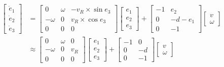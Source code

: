           \begin{align}
               \begin{bmatrix}
               \dot{e}_1 \\
               \dot{e}_2 \\
               \dot{e}_3
               \end{bmatrix} &= \begin{bmatrix}
               0 & \omega & -v_R \times \sin e_3 \\
               -\omega & 0 & v_R \times \cos e_3 \\
               0 & 0 & 0
               \end{bmatrix} \begin{bmatrix}
               e_1 \\
               e_2 \\
               e_3
               \end{bmatrix} + \begin{bmatrix}
               -1 & e_2 \\
               0 & -d - e_1 \\
               0 & -1
               \end{bmatrix} \begin{bmatrix}
               v \\
               \omega
               \end{bmatrix}\\
               &\approx \begin{bmatrix}
               0 & \omega & 0 \\
               -\omega & 0 & v_R \\
               0 & 0 & 0
               \end{bmatrix} \begin{bmatrix}
               e_1 \\
               e_2 \\
               e_3
               \end{bmatrix} + \begin{bmatrix}
               -1 & 0 \\
               0 & -d \\
               0 & -1
               \end{bmatrix} \begin{bmatrix}
               v \\
               \omega
               \end{bmatrix}
               \label{c6_e4}
          \end{align}
          

